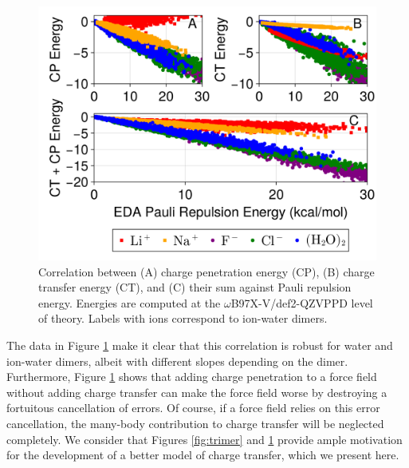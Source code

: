 \documentclass[journal=jctcce,manuscript=article]{achemso}
\begin{document}
\begin{figure}[H]
  \includegraphics*[width=\textwidth]{figures/pauli_ct_cp_correlation_with_ions.png}
  \caption{Correlation between (A) charge penetration energy (CP), (B) charge transfer energy (CT),
  and (C) their sum against Pauli repulsion energy.
  Energies are computed at the $\omega$B97X-V/def2-QZVPPD level of theory. Labels with ions correspond to ion-water dimers.}
  \label{fig:cp_ct_pauli}
\end{figure}
The data in Figure \ref{fig:cp_ct_pauli} make it clear that this correlation is robust for water and ion-water dimers, albeit with different slopes depending on the dimer. Furthermore, Figure \ref{fig:cp_ct_pauli} shows that adding charge penetration to a force field without adding charge transfer can make the force field worse by destroying a fortuitous cancellation of errors. Of course, if a force field relies on this error cancellation, the many-body contribution to charge transfer will be neglected completely. We consider that Figures \ref{fig:trimer} and \ref{fig:cp_ct_pauli} provide ample motivation for the development of a better model of charge transfer, which we present here.
\end{document}
